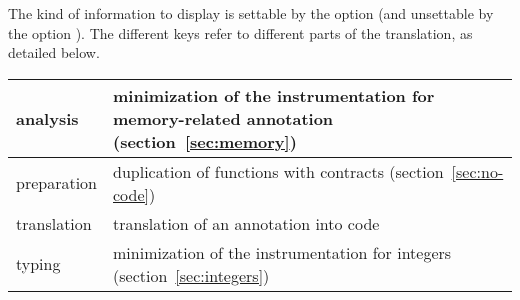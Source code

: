 The kind of information to display is settable by the option
 (and unsettable by the option
). The different keys refer to different
parts of the translation, as detailed below.

\begin{center}
  \begin{tabular}{|l|l|}
    \hline
    analysis    & minimization of the instrumentation for memory-related annotation
    (section~\ref{sec:memory})                                                      \\
    \hline
    preparation & duplication of functions with contracts
    (section~\ref{sec:no-code})                                                     \\
    \hline
    translation & translation of an annotation into \C code                         \\
    \hline
    typing      & minimization of the instrumentation for integers
    (section~\ref{sec:integers})                                                    \\
    \hline
  \end{tabular}
\end{center}
